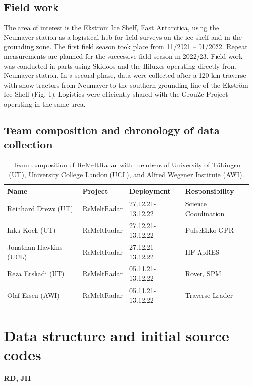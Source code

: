 \documentclass[a4paper,12pt]{article}
\begin{document}
\subsection{Field work}
The area of interest is the Ekström Ice Shelf, East Antarctica, using the Neumayer station as a logistical hub for field surveys on the ice shelf and in the grounding zone. The first field season took place from 11/2021 – 01/2022. Repeat measurements are planned for the successive field season in 2022/23. 
Field work was conducted in parts using Skidoos and the Hiluxes operating directly from Neumayer station. In a second phase, data were collected after a 120 km traverse with snow tractors from Neumayer to the southern grounding line of the Ekström Ice Shelf (Fig. 1). Logistics were efficiently shared with the GrouZe Project operating in the same area.

\pagebreak
\subsection{Team composition and chronology of data collection}
\begin{table}
\begin{tabular}{llll}
  \rowcolor{gray!50}
  Name & Project& Deployment& Responsibility\\
  \hline
Reinhard Drews (UT) & ReMeltRadar  &27.12.21-13.12.22& Science Coordination\\  
Inka Koch (UT) & ReMeltRadar & 27.12.21-13.12.22& PulseEkko GPR\\
Jonathan Hawkins (UCL) & ReMeltRadar  &27.12.21-13.12.22& HF ApRES\\
Reza Ershadi (UT) & ReMeltRadar &05.11.21-13.12.22& Rover, SPM\\
Olaf Eisen (AWI) & ReMeltRadar  &05.11.21-13.12.22& Traverse Leader\\
  \hline
\end{tabular}
\caption{\label{TableGPR}Team composition of ReMeltRadar with members of University of Tübingen (UT), University College London (UCL), and Alfred Wegener Institute (AWI).}
\end{table}
\section{Data structure and initial source codes}
\textbf{RD, JH}
\pagebreak
\end{document}
